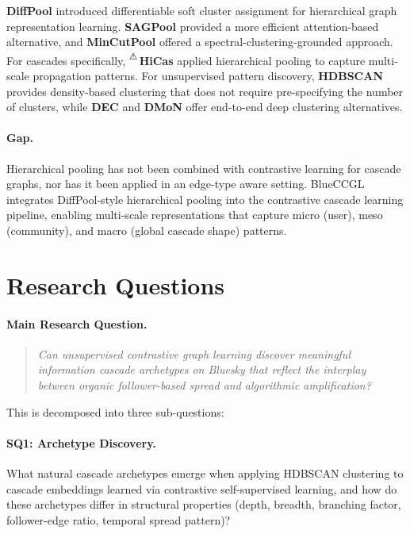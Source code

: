 \documentclass[12pt,a4paper]{article}
\newcommand{\flagcite}[1]{%
  {\color{orange}\textsuperscript{⚠}}\,#1%
}
\begin{document}
\textbf{DiffPool} \citep{ying2018diffpool} introduced differentiable soft
cluster assignment for hierarchical graph representation learning.
\textbf{SAGPool} \citep{lee2019sagpool} provided a more efficient
attention-based alternative, and \textbf{MinCutPool}
\citep{bianchi2020mincutpool} offered a spectral-clustering-grounded
approach.  For cascades specifically, \flagcite{\textbf{HiCas}
\citep{zhou2023hicas}} applied hierarchical pooling to capture multi-scale
propagation patterns.  For unsupervised pattern discovery, \textbf{HDBSCAN}
\citep{mcinnes2017hdbscan} provides density-based clustering that does not
require pre-specifying the number of clusters, while \textbf{DEC}
\citep{xie2016dec} and \textbf{DMoN} \citep{tsitsulin2023dmon} offer
end-to-end deep clustering alternatives.

\paragraph{Gap.}
Hierarchical pooling has not been combined with contrastive learning for
cascade graphs, nor has it been applied in an edge-type aware setting.
BlueCCGL integrates DiffPool-style hierarchical pooling into the contrastive
cascade learning pipeline, enabling multi-scale representations that capture
micro (user), meso (community), and macro (global cascade shape) patterns.

\section{Research Questions}

\paragraph{Main Research Question.}
\begin{quote}
\emph{Can unsupervised contrastive graph learning discover meaningful
information cascade archetypes on Bluesky that reflect the interplay between
organic follower-based spread and algorithmic amplification?}
\end{quote}

\noindent
This is decomposed into three sub-questions:

\paragraph{SQ1: Archetype Discovery.}
What natural cascade archetypes emerge when applying HDBSCAN clustering to
cascade embeddings learned via contrastive self-supervised learning, and how
do these archetypes differ in structural properties (depth, breadth, branching
factor, follower-edge ratio, temporal spread pattern)?
\end{document}
